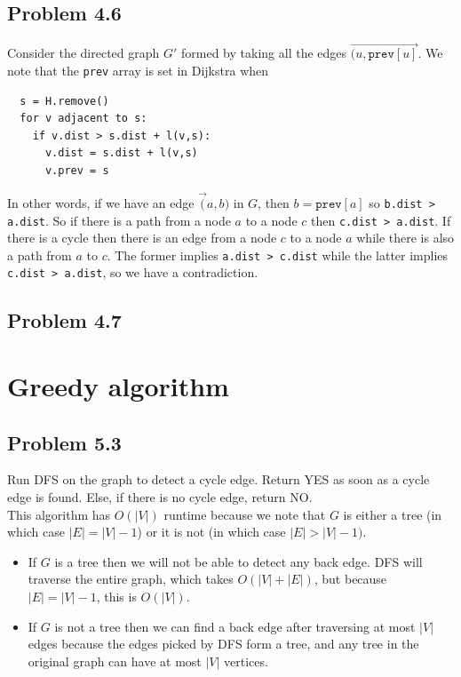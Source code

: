 \documentclass[12pt]{report}
\newcommand{\co}{\texttt}
\begin{document}
\section{Problem 4.6}
Consider the directed graph $G'$ formed by taking all the edges $\overrightarrow{(u, \co{prev}[u]}$. We note that the \co{prev} array is set in Dijkstra when
\begin{lstlisting}
  s = H.remove()
  for v adjacent to s:
    if v.dist > s.dist + l(v,s):
      v.dist = s.dist + l(v,s)
      v.prev = s
\end{lstlisting}
In other words, if we have an edge $\overrightarrow(a,b)$ in $G$, then $b = \co{prev}[a]$ so \co{b.dist > a.dist}. So if there is a path from a node $a$ to a node $c$ then \co{c.dist > a.dist}. If there is a cycle then there is an edge from a node $c$ to a node $a$ while there is also a path from $a$ to $c$. The former implies \co{a.dist > c.dist} while the latter implies \co{c.dist > a.dist}, so we have a contradiction.

\section{Problem 4.7}

\chapter[Chapter 5 Solution]{Greedy algorithm}

\section{Problem 5.3}
Run DFS on the graph to detect a cycle edge. Return YES as soon as a cycle edge is found. Else, if there is no cycle edge, return NO.\\
This algorithm has $O(|V|)$ runtime because we note that $G$ is either a tree (in which case $|E| = |V| - 1$) or it is not (in which case $|E| > |V| - 1)$.
\begin{itemize}
  \item If $G$ is a tree then we will not be able to detect any back edge. DFS will traverse the entire graph, which takes $O(|V| + |E|)$, but because $|E| = |V| - 1$, this is $O(|V|)$.
  \item If $G$ is not a tree then we can find a back edge after traversing at most $|V|$ edges because the edges picked by DFS form a tree, and any tree in the original graph can have at most $|V|$ vertices.
\end{itemize}
\end{document}
